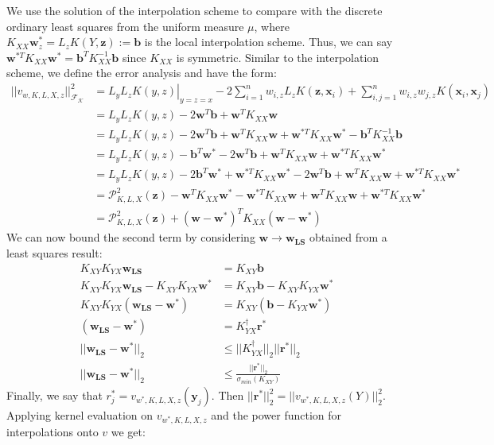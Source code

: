 \documentclass[11pt]{article}
\begin{document}
We use the solution of the interpolation scheme to compare with the discrete ordinary least squares from the uniform measure $\mu$, where $K_{XX} \bm{w}^*_z = L_zK(Y,\bm{z}):=\bm{b}$ is the local interpolation scheme. Thus, we can say $\bm{w}^{*T} K_{XX} \bm{w}^* = \bm{b}^T K_{XX}^{-1} \bm{b}$ since $K_{XX}$ is symmetric. Similar to the interpolation scheme, we define the error analysis and have the form:
\begin{align*}
||v_{w,K,L,X,z}||_\mathcal{F_K}^2 &= \left. L_y L_z K(y,z) \right|_{y=z=x} - 2 \sum_{i=1}^n w_{i,z} L_z K(\bm{z}, \bm{x}_i) + \sum_{i,j=1}^n w_{i,z}w_{j,z} K(\bm{x}_i, \bm{x}_j)\\
&= \left. L_y L_z K(y,z) \right. - 2 \bm{w}^T \bm{b} + \bm{w}^T K_{XX} \bm{w}\\
&= \left. L_y L_z K(y,z) \right. - 2 \bm{w}^T \bm{b} + \bm{w}^T K_{XX} \bm{w} + \bm{w}^{*T} K_{XX} \bm{w}^* - \bm{b}^T K_{XX}^{-1} \bm{b}\\
&= \left. L_y L_z K(y,z) \right. - \bm{b}^T \bm{w}^* - 2 \bm{w}^T \bm{b} + \bm{w}^T K_{XX} \bm{w} + \bm{w}^{*T} K_{XX} \bm{w}^*\\
&= \left. L_y L_z K(y,z) \right. - 2 \bm{b}^T \bm{w}^* + \bm{w}^{*T} K_{XX} \bm{w}^* - 2 \bm{w}^T \bm{b} + \bm{w}^T K_{XX} \bm{w} + \bm{w}^{*T} K_{XX} \bm{w}^*\\
&= \mathcal{P}_{K,L,X}^2(\bm{z}) - \bm{w}^T K_{XX} \bm{w}^{*} - \bm{w}^{*T} K_{XX} \bm{w} + \bm{w}^T K_{XX} \bm{w} + \bm{w}^{*T} K_{XX} \bm{w}^*\\
&= \mathcal{P}_{K,L,X}^2(\bm{z}) +  \left( \bm{w} - \bm{w}^* \right)^T K_{XX} \left( \bm{w} - \bm{w}^* \right)
\end{align*}
We can now bound the second term by considering $\bm{w}\rightarrow \bm{w_{LS}}$ obtained from a least squares result: 
\begin{align*}
K_{XY}K_{YX}\bm{w_{LS}}&=K_{XY}\bm{b}\\
K_{XY}K_{YX}\bm{w_{LS}}-K_{XY}K_{YX}\bm{w}^*&=K_{XY}\bm{b}-K_{XY}K_{YX}\bm{w^*}\\
K_{XY}K_{YX}(\bm{w_{LS}}-\bm{w}^*)&=K_{XY}(\bm{b}-K_{YX}\bm{w}^*)\\
(\bm{w_{LS}}-\bm{w}^*)&= K_{YX}^{\dagger}\bm{r}^*\\
|| \bm{w_{LS}}-\bm{w}^* ||_2 &\le ||K_{YX}^{\dagger} ||_2 || \bm{r}^* ||_2\\
|| \bm{w_{LS}}-\bm{w}^* ||_2 &\le \frac{|| \bm{r}^* ||_2}{\sigma_{min}(K_{XY})}
\end{align*}
Finally, we say that $r^*_j=v_{w^*,K,L,X,z}(\bm{y}_j)$. Then $|| \bm{r}^* ||^2_2 = || v_{w^*,K,L,X,z}(Y) ||_2^2$. Applying kernel evaluation on $v_{w^*,K,L,X,z}$ and the power function for interpolations onto $v$ we get:
\end{document}
